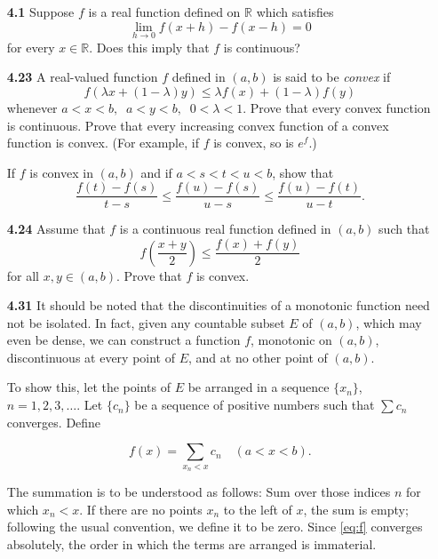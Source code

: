 \documentclass[11pt]{article}
\begin{document}
\begin{itemize}
  \item [\textbf{4.1}] Suppose \(f\) is a real function defined on \(\mathbb{R}\) which satisfies 
    \[\lim_{h \to 0} f(x+h) - f(x-h) = 0\]
    for every \(x \in \mathbb{R}\).  Does this imply that \(f\) is continuous?
    \newpage

  \item [\textbf{4.23}] A real-valued function \(f\) defined in \((a,b)\) is said to be \textit{convex} if
    \[f(\lambda x + (1 - \lambda)y) \leq \lambda f(x) + (1 - \lambda) f(y)\]
    whenever \(a < x < b, \;\; a < y < b, \;\; 0 < \lambda < 1\).  Prove that every convex function 
    is continuous.  Prove that every increasing convex function of a convex function is convex. 
    (For example, if \(f\) is convex, so is \(e^f\).)

    If \(f\) is convex in \((a,b)\) and if \(a < s < t < u < b\), show that 
    \[\frac{f(t) - f(s)}{t - s} \leq \frac{f(u) - f(s)}{u - s} \leq \frac{f(u) - f(t)}{u - t}.\]
    \newpage

  \item [\textbf{4.24}] Assume that \(f\) is a continuous real function defined in \((a,b)\) such that 
    \[f \left(\frac{x + y}{2}\right) \leq \frac{f(x) + f(y)}{2}\]
    for all \(x,y \in (a,b)\).  Prove that \(f\) is convex.
    \newpage

  \item [\textbf{4.31}]
    It should be noted that the discontinuities of a monotonic function need not be isolated.  In fact, 
    given any countable subset \(E\) of \((a,b)\), which may even be dense, we can construct a function 
    \(f\), monotonic on \((a,b)\), discontinuous at every point of \(E\), and at no other point of 
    \((a,b)\). 

    To show this, let the points of \(E\) be arranged in a sequence \(\{x_n\}\), \(n = 1,2,3,\dots\). 
    Let \(\{c_n\}\) be a sequence of positive numbers such that \(\sum c_n\) converges.  Define

    \begin{equation} f(x) = \sum_{x_n < x} c_n \quad (a < x < b). \tag{31}\label{eq:f} \end{equation}

    The summation is to be understood as follows: Sum over those indices \(n\) for which \(x_n < x\). 
    If there are no points \(x_n\) to the left of \(x\), the sum is empty; following the usual 
    convention, we define it to be zero.  Since \eqref{eq:f} converges absolutely, the order in which 
    the terms are arranged is immaterial.


\end{itemize}
\end{document}
